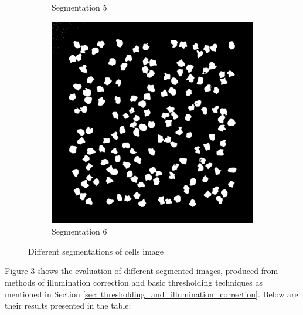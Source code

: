 \documentclass[%
	a4paper, %
	12pt, %
	english, %
	bibtotoc %
]{scrartcl}
\begin{document}
\begin{figure}[H]
\begin{subfigure}[b]{0.2\textwidth}
        \caption{Segmentation 5}
        \label{Segmentation5}
    \end{subfigure}
    \hfill
    \begin{subfigure}[b]{0.2\textwidth}
        \includegraphics[width=\textwidth]{segmentation_thresholding_74_illuminated.png}
        \caption{Segmentation 6}
        \label{Segmentation6}
    \end{subfigure}

    \caption{Different segmentations of cells image}
    \label{fig:segmentation_results}
\end{figure}



Figure \ref{fig:segmentation_results} shows the evaluation of different segmented images, produced from methods of illumination correction and basic thresholding techniques as mentioned in Section \ref{sec: thresholding_and_illumination_correction}. Below are their results presented in the table:
\end{document}
